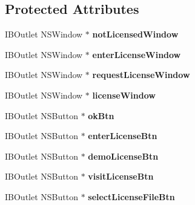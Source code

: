 \subsection*{Protected Attributes}
\begin{DoxyCompactItemize}
\item 
\hypertarget{interface_license_controller_a621ce5f5b4fdc6b2960a1310b35aaf2f}{
IBOutlet NSWindow $\ast$ {\bfseries notLicensedWindow}}
\label{interface_license_controller_a621ce5f5b4fdc6b2960a1310b35aaf2f}

\item 
\hypertarget{interface_license_controller_a25beadabf071560b85f20d5355d0e2d9}{
IBOutlet NSWindow $\ast$ {\bfseries enterLicenseWindow}}
\label{interface_license_controller_a25beadabf071560b85f20d5355d0e2d9}

\item 
\hypertarget{interface_license_controller_a27e60bf7a046c328327cf591afd79847}{
IBOutlet NSWindow $\ast$ {\bfseries requestLicenseWindow}}
\label{interface_license_controller_a27e60bf7a046c328327cf591afd79847}

\item 
\hypertarget{interface_license_controller_aafdb5f3409aa9982ffface64ba2100f9}{
IBOutlet NSWindow $\ast$ {\bfseries licenseWindow}}
\label{interface_license_controller_aafdb5f3409aa9982ffface64ba2100f9}

\item 
\hypertarget{interface_license_controller_a2f7a5a1210ec31dc93e70141829c65f5}{
IBOutlet NSButton $\ast$ {\bfseries okBtn}}
\label{interface_license_controller_a2f7a5a1210ec31dc93e70141829c65f5}

\item 
\hypertarget{interface_license_controller_a03c801df7bbf33df35318540621d97cc}{
IBOutlet NSButton $\ast$ {\bfseries enterLicenseBtn}}
\label{interface_license_controller_a03c801df7bbf33df35318540621d97cc}

\item 
\hypertarget{interface_license_controller_ab39d638b8619aac3d4981399d7f67f7f}{
IBOutlet NSButton $\ast$ {\bfseries demoLicenseBtn}}
\label{interface_license_controller_ab39d638b8619aac3d4981399d7f67f7f}

\item 
\hypertarget{interface_license_controller_a262b6f14311aeb197194c21ef46fc58b}{
IBOutlet NSButton $\ast$ {\bfseries visitLicenseBtn}}
\label{interface_license_controller_a262b6f14311aeb197194c21ef46fc58b}

\item 
\hypertarget{interface_license_controller_a4356bbb4175f18844ab3e4998319e3f5}{
IBOutlet NSButton $\ast$ {\bfseries selectLicenseFileBtn}}
\label{interface_license_controller_a4356bbb4175f18844ab3e4998319e3f5}


\end{DoxyCompactItemize}
